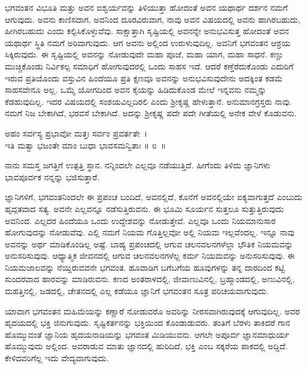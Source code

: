 ಭಗವಂತನ ವಿಭೂತಿ ಮತ್ತು ಅವನ ಐಶ್ವರ್ಯವನ್ನು ತಿಳಿಯುತ್ತಾ ಹೋದಂತೆ ಅವನ ಯಥಾರ್ಥ ದರ್ಶನ ನಮಗೆ ಆಗುವುದು. ಅವನು ಕಾಣಿಸದಾಗ, ಅವನಿಂದ ದೂರವಿರುವಾಗ, ನಾವು ಅವನ ವಿಷಯದಲ್ಲಿ ಅವನು ಹಾಗಿರಬಹುದು, ಹೀಗಿರಬಹುದು ಎಂದು ಕಲ್ಪಿಸಿಕೊಳ್ಳುವೆವು. ಸಾಕ್ಷಾತ್ತಾಗಿ ಸೃಷ್ಟಿಯಲ್ಲಿ ಅವನನ್ನೇ ಅನುಭವಿಸುತ್ತ ಹೋದಂತೆ ಅವನ ಯಥಾರ್ಥ ಸ್ಥಿತಿ ನಮಗೆ ಅರಿವಾಗುವುದು. ಆಗ ಅವನು ಅಲ್ಲಿಂದ ಉರುಳುವುದಿಲ್ಲ. ಅವನಿಗೆ ಭಗವಂತನ ಆಶ್ರಯ ಸಿಕ್ಕಿರುವುದು. ಈ ಸೃಷ್ಟಿಯಲ್ಲಿ ಅವನನ್ನು ನೋಡುವುದೇ ಮಹಾ ಪೂಜೆ, ಮಹಾ ಯಾಗ, ಮಹಾ ಸಾಧನೆ. ಕಣ್ಣು ಮುಚ್ಚಿಕೊಂಡು ನಿರ್ವಿಕಲ್ಪ ಸಮಾಧಿಗೆ ಹೋಗುವುದರಲ್ಲಿ ಒಂದು ಸಾಹಸ ಇದೆ. ಆದರೆ ಕಣ್ತೆರೆದುಕೊಂಡು ಎದುರಿಗೆ ಇರುವ ಪ್ರತಿಯೊಂದು ವಸ್ತುವಿನ ಹಿಂದೆಯೂ ಪ್ರತಿ ಕ್ಷಣವೂ ಅವನನ್ನು ಅನುಭವಿಸುವುದೇನು ಅದಕ್ಕಿಂತ ಕಡಮೆ ಸಾಹಸವೇನೂ ಅಲ್ಲ. ಒಮ್ಮೆ ಯೋಗದಿಂದ ಅವನ ಕೈಯನ್ನು ಹಿಡಿದುಕೊಂಡ ಮೇಲೆ ಇನ್ನವನು ನಮ್ಮನ್ನು ಕೆಡಹುವುದಿಲ್ಲ. ಇದರ ವಿಷಯದಲ್ಲಿ ಸಂಶಯವಿಲ್ಲದಿರಲಿ ಎಂದು ಶ‍್ರೀಕೃಷ್ಣ ಹೇಳುತ್ತಾನೆ. ಅನುಮಾನಗ್ರಸ್ತರು ನಾವು. ನಮಗೆ ನಿಜ ಬೇಕಾಗಿದೆ, ಭರವಸೆ ಬೇಕಾಗಿದೆ. ಅದನ್ನು ಶ‍್ರೀಕೃಷ್ಣ ಪದೇ ಪದೇ ಗೀತೆಯಲ್ಲಿ ಅನೇಕ ವೇಳೆ ಕೊಡುವನು.

\begin{shloka}
ಅಹಂ ಸರ್ವಸ್ಯ ಪ್ರಭಾವೋ ಮತ್ತಃ ಸರ್ವಂ ಪ್ರವರ್ತತೇ~।\\ಇತಿ ಮತ್ವಾ ಭಜಂತೇ ಮಾಂ ಬುಧಾ ಭಾವಸಮನ್ವಿತಾಃ \hfill॥ ೮~॥
\end{shloka}

\begin{artha}
ನಾನು ಸಮಸ್ತ ಜಗತ್ತಿಗೆ ಉತ್ಪತ್ತಿ ಸ್ಥಾನ. ನನ್ನಿಂದಲೇ ಎಲ್ಲವೂ ನಡೆಯುತ್ತಿದೆ. ಹೀಗೆಂದು ತಿಳಿದು ಜ್ಞಾನಿಗಳು ಭಾವಪೂರ್ವಕ ನನ್ನನ್ನು ಭಜಿಸುತ್ತಾರೆ.
\end{artha}

ಜ್ಞಾನಿಗಳಿಗೆ, ಭಗವಂತನಿಂದಲೇ ಈ ಪ್ರಪಂಚ ಬಂದಿದೆ, ಅವನಲ್ಲಿದೆ, ಕೊನೆಗೆ ಅವನಲ್ಲಿಯೇ ಐಕ್ಯವಾಗುತ್ತದೆ ಎಂಬುದು ಹೃದ್ಗತವಾದ ಸತ್ಯ. ಅವನೇ ಎಲ್ಲವನ್ನೂ ನಡೆಸುತ್ತಿರುವನು. ಈ ಭೂಮಿ ಸೂರ್ಯನ ಸುತ್ತಲೂ ಸುತ್ತುತ್ತಿರುವುದು ಅವನಿಂದ. ಎಲ್ಲದರ ಹಿಂದೆಯೂ ಒಂದು ಉದ್ದೇಶವನ್ನು ನೋಡುತ್ತೇವೆ. ಎಲ್ಲವೂ ಒಂದು ನಿಯಮಾನುಸಾರ ಹೋಗುವುದನ್ನು ನೋಡು\-ವೆವು. ಎಲ್ಲಿ ನಮಗೆ ನಿಯಮ ಗೊತ್ತಿಲ್ಲವೋ ಅಲ್ಲಿ ನಿಯಮ ಇಲ್ಲವೆಂದಲ್ಲ. ಇನ್ನೂ ನಾವು ಅವನನ್ನು ಅರ್ಥ ಮಾಡಿಕೊಂಡಿಲ್ಲ ಅಷ್ಟೆ. ಬಾಹ್ಯ ಪ್ರಪಂಚದಲ್ಲಿ ಆಗುವ ಚಲನವಲನಗಳೆಲ್ಲಾ ಭೌತಿಕ ನಿಯಮವನ್ನು ಅನುಸರಿಸುವುವು. ಆಧ್ಯಾತ್ಮಿಕ ಜೀವನದಲ್ಲಿ ಆಗುವ ಚಲನವಲನಗಳೆಲ್ಲ ಕರ್ಮ ನಿಯಮವನ್ನು ಅನುಸರಿಸುವುವು. ಈ ನಿಯಮಜಾಲವನ್ನು ನೆಯ್ದಿರುವವನೇ ಭಗವಂತ. ಹೂವಾಡಿಗ ಬಗೆಬಗೆಯ ಹೂವುಗಳನ್ನು ತನ್ನ ದಾರದಿಂದ ಕಟ್ಟಿ ಸುಂದರವಾದ ಹಾರವನ್ನು ಮಾಡಿರುವನು. ಕಣದ ಅಂತರಾಳದಲ್ಲಿ, ಜೀವಾಣುವಿನಲ್ಲಿ, ಬ್ರಹ್ಮಾಂಡದಲ್ಲಿ, ಅಣುವಿನಲ್ಲಿ, ಮಹತ್ತಿನಲ್ಲಿ, ಜಡದಲ್ಲಿ, ಚೇತನದಲ್ಲಿ ಎಲ್ಲ ಕಡೆಯೂ ಜ್ಞಾನಿಗೆ ಭಗವಂತನ ಸೂತ್ರ ಪರಿಚಯವಾಗುವುದು.

ಯಾವಾಗ ಭಗವಂತನ ಮಹಿಮೆಯನ್ನು ಕಣ್ಣಾರೆ ನೋಡುವರೊ ಅವರಿನ್ನು ನೀರಸವಾಗಿರುವುದಕ್ಕೆ ಆಗುವುದಿಲ್ಲ. ಅವರ ಹೃದಯದಲ್ಲಿ ಭಕ್ತಿ ಜಿನುಗುವುದು. ಸೃಷ್ಟಿಕರ್ತನನ್ನು ಭಕ್ತಿಯಿಂದ ಕೊಂಡಾಡುವರು. ತಂತಿಗೆ ಬೆರಳು ತಾಕಿದರೆ ಗಾನ ಹೊಮ್ಮುವಂತೆ ಜ್ಞಾನಿಯ ಹೃದಯನಾಡಿಯನ್ನು ಭಗವಂತ ಮಿಡಿಯುವನು. ಆಗಲೇ ಅಪೂರ್ವ ಜ್ಞಾನಮಾಧುರ್ಯ ಹೊಮ್ಮುವುದು ಅಲ್ಲಿಂದ. ಅವರಾಡುವ ಮಾತು ಜ್ಞಾನದಲ್ಲಿ ಹುರಿದಿದೆ, ಭಕ್ತಿ ಎಂಬ ಸಕ್ಕರೆಯ ಪಾಕದಲ್ಲಿ ಅದ್ದಿದೆ. ಕೇಳಿದವರಿಗೆಲ್ಲ ಇದು ವೇದ್ಯವಾಗುವುದು.

